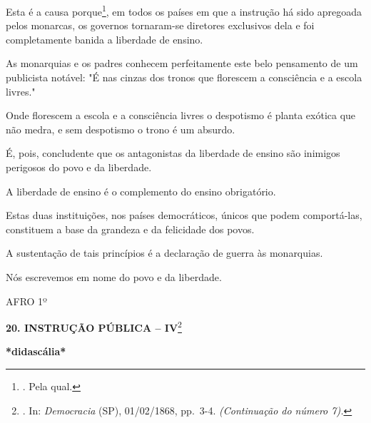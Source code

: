 Esta é a causa porque\footnote{. Pela qual.}, em todos os países em que
a instrução há sido apregoada pelos monarcas, os governos tornaram-se
diretores exclusivos dela e foi completamente banida a liberdade de
ensino.

As monarquias e os padres conhecem perfeitamente este belo pensamento de
um publicista notável: "É nas cinzas dos tronos que florescem a
consciência e a escola livres."

Onde florescem a escola e a consciência livres o despotismo é planta
exótica que não medra, e sem despotismo o trono é um absurdo.

É, pois, concludente que os antagonistas da liberdade de ensino são
inimigos perigosos do povo e da liberdade.

A liberdade de ensino é o complemento do ensino obrigatório.

Estas duas instituições, nos países democráticos, únicos que podem
comportá-las, constituem a base da grandeza e da felicidade dos povos.

A sustentação de tais princípios é a declaração de guerra às monarquias.

Nós escrevemos em nome do povo e da liberdade.

AFRO 1º

\textbf{20. INSTRUÇÃO PÚBLICA -- IV}\footnote{. In: \emph{Democracia}
  (SP), 01/02/1868, pp.~3-4. \emph{(Continuação do número 7).}}

\textbf{*didascália*}

